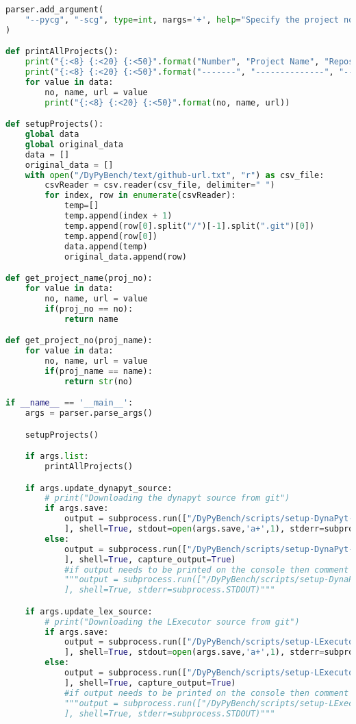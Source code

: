 \begin{lstlisting}[caption=Access Interface of DyPyBench.,label=code:dypybench.py,language=Python]
parser.add_argument(
    "--pycg", "-scg", type=int, nargs='+', help="Specify the project no. to run PyCG for static call graph generation"
)

def printAllProjects():
    print("{:<8} {:<20} {:<50}".format("Number", "Project Name", "Repository URL"))
    print("{:<8} {:<20} {:<50}".format("-------", "--------------", "---------------------------------"))
    for value in data:
        no, name, url = value
        print("{:<8} {:<20} {:<50}".format(no, name, url))

def setupProjects():
    global data
    global original_data
    data = []
    original_data = []
    with open("/DyPyBench/text/github-url.txt", "r") as csv_file:
        csvReader = csv.reader(csv_file, delimiter=" ")
        for index, row in enumerate(csvReader):
            temp=[]
            temp.append(index + 1)
            temp.append(row[0].split("/")[-1].split(".git")[0])
            temp.append(row[0])
            data.append(temp)
            original_data.append(row)

def get_project_name(proj_no):
    for value in data:
        no, name, url = value
        if(proj_no == no):
            return name

def get_project_no(proj_name):
    for value in data:
        no, name, url = value
        if(proj_name == name):
            return str(no)

if __name__ == '__main__':
    args = parser.parse_args()

    setupProjects()

    if args.list:
        printAllProjects()

    if args.update_dynapyt_source:
        # print("Downloading the dynapyt source from git")
        if args.save:
            output = subprocess.run(["/DyPyBench/scripts/setup-DynaPyt-src.sh"
            ], shell=True, stdout=open(args.save,'a+',1), stderr=subprocess.STDOUT)
        else:
            output = subprocess.run(["/DyPyBench/scripts/setup-DynaPyt-src.sh"
            ], shell=True, capture_output=True)
            #if output needs to be printed on the console then comment above and uncomment below
            """output = subprocess.run(["/DyPyBench/scripts/setup-DynaPyt-src.sh"
            ], shell=True, stderr=subprocess.STDOUT)"""

    if args.update_lex_source:
        # print("Downloading the LExecutor source from git")
        if args.save:
            output = subprocess.run(["/DyPyBench/scripts/setup-LExecutor-src.sh"
            ], shell=True, stdout=open(args.save,'a+',1), stderr=subprocess.STDOUT)
        else:
            output = subprocess.run(["/DyPyBench/scripts/setup-LExecutor-src.sh"
            ], shell=True, capture_output=True)
            #if output needs to be printed on the console then comment above and uncomment below
            """output = subprocess.run(["/DyPyBench/scripts/setup-LExecutor-src.sh"
            ], shell=True, stderr=subprocess.STDOUT)"""


\end{lstlisting}
